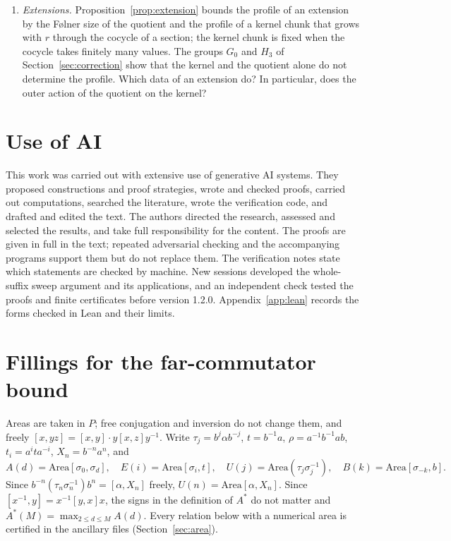 \documentclass[11pt,a4paper]{article}
\theoremstyle{plain}
\theoremstyle{definition}
\theoremstyle{remark}
\begin{document}
\begin{enumerate}[label=(\arabic*)]
Proposition~3.17, hence from Theorem~3.15. Is there a matching lower bound?
\item \emph{Extensions.} Proposition~\ref{prop:extension} bounds the profile of an extension by the Følner size of the quotient and the profile of a
kernel chunk that grows with $r$ through the cocycle of a section; the kernel chunk is fixed when the cocycle takes finitely many values. The
groups $G_0$ and $H_3$ of Section~\ref{sec:correction} show that the kernel and the quotient alone do not determine the profile. Which data of an
extension do? In particular, does the outer action of the quotient on the kernel?
\end{enumerate}

\section*{Use of AI}

This work was carried out with extensive use of generative AI systems. They proposed constructions and proof strategies, wrote and
checked proofs, carried out computations, searched the literature, wrote the verification code, and drafted and edited the text. The
authors directed the research, assessed and selected the results, and take full responsibility for the content. The proofs are given in
full in the text; repeated adversarial checking and the accompanying programs support them but do not replace them. The verification
notes state which statements are checked by machine. New sessions developed the whole-suffix sweep argument and its applications,
and an independent check tested the proofs and finite certificates before version 1.2.0.
Appendix~\ref{app:lean} records the forms checked in Lean and their limits.

\appendix
\section{Fillings for the far-commutator bound}\label{app:area}

Areas are taken in $P$; free conjugation and inversion do not change them, and freely $[x,yz]=[x,y]\cdot y[x,z]y^{-1}$.
Write $\tau_j=b^j\alpha b^{-j}$, $t=b^{-1}a$, $\rho=a^{-1}b^{-1}ab$, $t_i=a^ita^{-i}$, $X_n=b^{-n}a^n$, and
\[
A(d)=\mathrm{Area}[\sigma_0,\sigma_d],\quad E(i)=\mathrm{Area}[\sigma_i,t],\quad U(j)=\mathrm{Area}(\tau_j\sigma_j^{-1}),\quad
B(k)=\mathrm{Area}[\sigma_{-k},b].
\]
Since $b^{-n}(\tau_n\sigma_n^{-1})b^n=[\alpha,X_n]$ freely, $U(n)=\mathrm{Area}[\alpha,X_n]$. Since
$[x^{-1},y]=x^{-1}[y,x]x$, the signs in the definition of $A^*$ do not matter and $A^*(M)=\max_{2\le d\le M}A(d)$. Every
relation below with a numerical area is certified in the ancillary files (Section~\ref{sec:area}).
\end{document}
